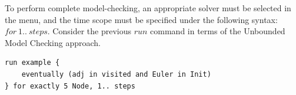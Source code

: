 To perform complete model-checking, an appropriate solver must be selected in the  menu, and the time scope must be specified under the following syntax: $for\ 1..\ steps$. Consider the previous $run$ command in terms of the Unbounded Model Checking approach. 

\begin{lstlisting}[title={Unbounded Model Checking: Eventually the graph will represent an \textit{Eulerian} circuit.}, otherkeywords = {run, eventually, in, and, for, exactly, \5, steps}, floatplacement=H]
run example {
    eventually (adj in visited and Euler in Init)
} for exactly 5 Node, 1.. steps
\end{lstlisting}